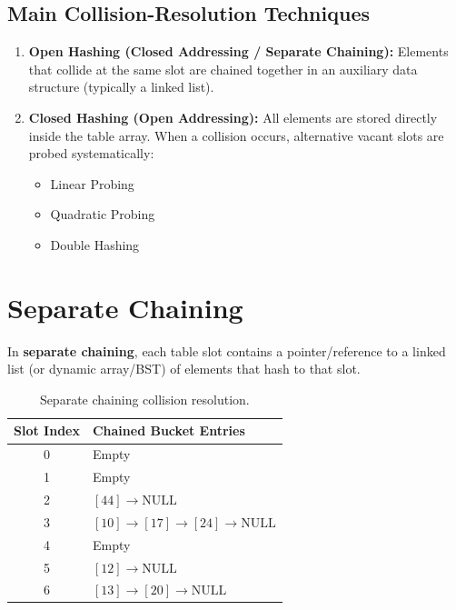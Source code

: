 \subsection{Main Collision-Resolution Techniques}
\begin{enumerate}
    \item \textbf{Open Hashing (Closed Addressing / Separate Chaining):} Elements that collide at the same slot are chained together in an auxiliary data structure (typically a linked list).
    \item \textbf{Closed Hashing (Open Addressing):} All elements are stored directly inside the table array. When a collision occurs, alternative vacant slots are probed systematically:
    \begin{itemize}
        \item Linear Probing
        \item Quadratic Probing
        \item Double Hashing
    \end{itemize}
\end{enumerate}

\section{Separate Chaining}

In \textbf{separate chaining}, each table slot contains a pointer/reference to a linked list (or dynamic array/BST) of elements that hash to that slot.

\begin{table}[htbp]
\centering
\small
\begin{tabular}{c l}
\toprule
\textbf{Slot Index} & \textbf{Chained Bucket Entries} \\
\midrule
0 & Empty \\
1 & Empty \\
2 & $[44] \rightarrow \text{NULL}$ \\
3 & $[10] \rightarrow [17] \rightarrow [24] \rightarrow \text{NULL}$ \\
4 & Empty \\
5 & $[12] \rightarrow \text{NULL}$ \\
6 & $[13] \rightarrow [20] \rightarrow \text{NULL}$ \\
\bottomrule
\end{tabular}
\caption{Separate chaining collision resolution.}
\end{table}


